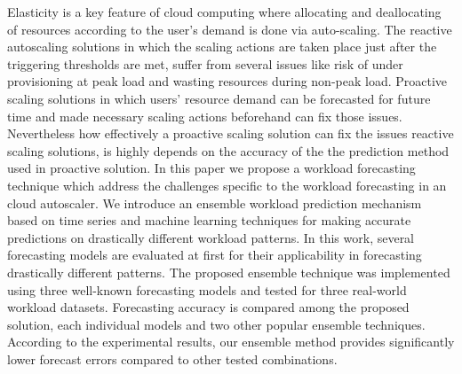 Elasticity is a key feature of cloud computing where allocating and deallocating of resources according to the user’s demand is done via auto-scaling. The reactive autoscaling solutions in which the scaling actions are taken place just after the triggering thresholds are met, suffer from several issues like risk of under provisioning at peak load and wasting resources during non-peak load. Proactive scaling solutions in which users’ resource demand can be forecasted for future time and made necessary scaling actions beforehand can fix those issues. Nevertheless how effectively a proactive scaling solution can fix the issues reactive scaling solutions, is highly depends on the accuracy of the the prediction method used in proactive solution. In this paper we propose a workload forecasting technique which address the challenges specific to the workload forecasting in an cloud autoscaler. We introduce an ensemble workload prediction mechanism based on time series and machine learning techniques for making accurate predictions on drastically different workload patterns.  In this work, several forecasting models are evaluated at first for their applicability in forecasting drastically different patterns. The proposed ensemble technique was implemented using three well-known forecasting models and tested for three real-world workload datasets. Forecasting accuracy is compared among the proposed solution, each individual models and two other popular ensemble techniques.  According to the experimental results, our ensemble method provides significantly lower forecast errors compared to other tested combinations. 